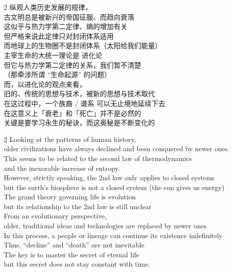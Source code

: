 \begin{itemize}
	\item[2] 纵观人类历史发展的规律， \\
	古文明总是被新兴的帝国征服、而趋向衰落 \\
	这似乎与热力学第二定律、熵的增加有关 \\
	但严格来说此定律只对封闭体系适用 \\
	而地球上的生物圈不是封闭体系（太阳给我们能量） \\
	主宰生命的大统一理论是 进化论 \\
	但它与热力学第二定律的关系，我们暂不清楚 \\
	（那牵涉所谓 “生命起源” 的问题） \\
	而，以进化论的观点来看， \\
	旧的、传统的思想与技术，被新的思想与技术取代 \\
	在这过程中，一个族裔 / 谱系 可以无止境地延续下去 \\
	在这意义上「衰老」和「死亡」并不是必然的 \\
	关键是要学习永生的秘诀，而这奥秘是不断变化的

	\item[2] Looking at the patterns of human history, \\
	older civilizations have always declined and been conquered by newer ones. \\
	This seems to be related to the second law of thermodynamics \\
	and the inexorable increase of entropy. \\
	However, strictly speaking, the 2nd law only applies to closed systems \\
	but the earth's biosphere is not a closed system (the sun gives us energy) \\
	The grand theory governing life is evolution \\
	but its relationship to the 2nd law is still unclear \\
	From an evolutionary perspective, \\
	older, traditional ideas and technologies are replaced by newer ones \\
	In this process, a people or lineage can continue its existence indefinitely \\
	Thus, ``decline'' and ``death'' are not inevitable \\
	The key is to master the secret of eternal life \\
	but this secret does not stay constant with time.


\end{itemize}
